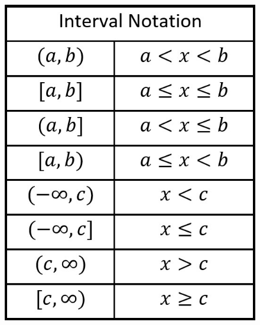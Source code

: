 \documentclass{article}
\begin{document}
\begin{figure}[h!]
\begin{minipage}{0.48\textwidth}
        \includegraphics[scale=0.5]{Interval_chart2_8-26.jpg}
        \label{fig:image2}
    \end{minipage}
\end{figure}

\end{document}
